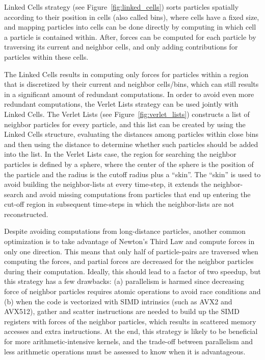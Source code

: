 \documentclass[Afour,sageh,times]{sagej}
\begin{document}
Linked Cells strategy (see Figure~\ref{fig:linked_cells}) sorts particles spatially according to their position in cells (also called bins), where cells have a fixed size, and mapping particles into cells can be done directly by computing in which cell a particle is contained within.
After, forces can be computed for each particle by traversing its current and neighbor cells, and only adding contributions for particles within these cells.

The Linked Cells results in computing only forces for particles within a region that is discretized by their current and neighbor cells/bins, which can still results in a significant amount of redundant computations.
In order to avoid even more redundant computations, the Verlet Lists strategy can be used jointly with Linked Cells.
The Verlet Lists (see Figure~\ref{fig:verlet_lists}) constructs a list of neighbor particles for every particle, and this list can be created by using the Linked Cells structure, evaluating the distances among particles within close bins and then using the distance to determine whether such particles should be added into the list.
In the Verlet Lists case, the region for searching the neighbor particles is defined by a sphere, where the center of the sphere is the position of the particle and the radius is the cutoff radius plus a ``skin''.
The ``skin'' is used to avoid building the neighbor-lists at every time-step, it extends the neighbor-search and avoid missing computations from particles that end up entering the cut-off region in subsequent time-steps in which the neighbor-lists are not reconstructed.

Despite avoiding computations from long-distance particles, another common optimization is to take advantage of Newton's Third Law and compute forces in only one direction.
This means that only half of particle-pairs are traversed when computing the forces, and partial forces are decreased for the neighbor particles during their computation.
Ideally, this should lead to a factor of two speedup, but this strategy has a few drawbacks: (a) parallelism is harmed since decreasing force of neighbor particles requires atomic operations to avoid race conditions and (b) when the code is vectorized with SIMD intrinsics (such as AVX2 and AVX512), gather and scatter instructions are needed to build up the SIMD registers with forces of the neighbor particles, which results in scattered memory accesses and extra instructions.
At the end, this strategy is likely to be beneficial for more arithmetic-intensive kernels, and the trade-off between parallelism and less arithmetic operations must be assessed to know when it is advantageous.
\end{document}
